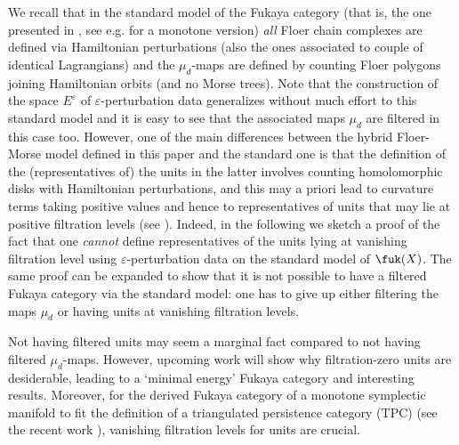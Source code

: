 	We recall that in the standard model of the Fukaya category (that is, the one presented in \cite{Se:book-fukaya-categ}, see e.g. \cite{Bi-Co:lcob-fuk} for a monotone version) \textit{all} Floer chain complexes are defined via Hamiltonian perturbations (also the ones associated to couple of identical Lagrangians) and the $\mu_d$-maps are defined by counting Floer polygons joining Hamiltonian orbits (and no Morse trees). Note that the construction of the space $E^\varepsilon$ of $\varepsilon$-perturbation data generalizes without much effort to this standard model and it is easy to see that the associated maps $\mu_d$ are filtered in this case too. However, one of the main differences between the hybrid Floer-Morse model defined in this paper and the standard one is that the definition of the (representatives of) the units in the latter involves counting homolomorphic disks with Hamiltonian perturbations, and this may a priori lead to curvature terms taking positive values and hence to representatives of units that may lie at positive filtration levels (see \cite[Proposition 3.1(ii)]{Bi-Co-Sh:LagrSh}). Indeed, in the following we sketch a proof of the fact that one \textit{cannot }define representatives of the units lying at vanishing filtration level using $\varepsilon$-perturbation data on the standard model of $\fuk(X)$. The same proof can be expanded to show that it is not possible to have a filtered Fukaya category via the standard model: one has to give up either filtering the maps $\mu_d$ or having units at vanishing filtration levels. 
	\begin{rem} 
		Not having filtered units may seem a marginal fact compared to not having filtered $\mu_d$-maps. However, upcoming work will show why filtration-zero units are desiderable, leading to a `minimal energy' Fukaya category and interesting results. %
		Moreover, for the derived Fukaya category of a monotone symplectic manifold to fit the definition of a triangulated persistence category (TPC) (see the recent work \cite{BCZ:tpc}), vanishing filtration levels for units are crucial.
	\end{rem}
